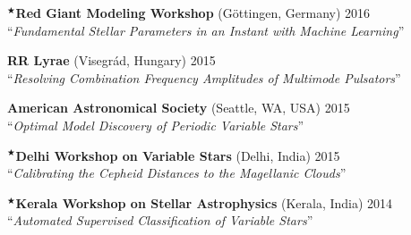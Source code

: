   \vspace{1mm}
  \noindent $^{\scriptscriptstyle\bigstar}$\textbf{Red Giant Modeling Workshop} (G\"ottingen, Germany) \hfill{2016} \\
  \hphantom{$^{\scriptscriptstyle\bigstar}$}``\emph{Fundamental Stellar Parameters in an Instant with Machine Learning}''
  
  \vspace{1mm}
  \noindent \hphantom{$^{\scriptscriptstyle\bigstar}$}\textbf{RR Lyrae} (Visegr\'ad, Hungary) \hfill{2015} \\
  \hphantom{$^{\scriptscriptstyle\bigstar}$}``\emph{Resolving Combination Frequency Amplitudes of Multimode Pulsators}''
  
  \vspace{1mm}
  \noindent \hphantom{$^{\scriptscriptstyle\bigstar}$}\textbf{American Astronomical Society} (Seattle, WA, USA) \hfill{2015} \\
  \hphantom{$^{\scriptscriptstyle\bigstar}$}``\emph{Optimal Model Discovery of Periodic Variable Stars}''
  
  \vspace{1mm}
  \noindent $^{\scriptscriptstyle\bigstar}$\textbf{Delhi Workshop on Variable Stars} (Delhi, India) \hfill{2015} \\
  \hphantom{$^{\scriptscriptstyle\bigstar}$}``\emph{Calibrating the Cepheid Distances to the Magellanic Clouds}''
  
  \vspace{1mm}
  \noindent $^{\scriptscriptstyle\bigstar}$\textbf{Kerala Workshop on Stellar Astrophysics} (Kerala, India) \hfill{2014} \\
  \hphantom{$^{\scriptscriptstyle\bigstar}$}``\emph{Automated Supervised Classification of Variable Stars}''
  
  
  
  
  
  \vspace*{-4.2mm}

